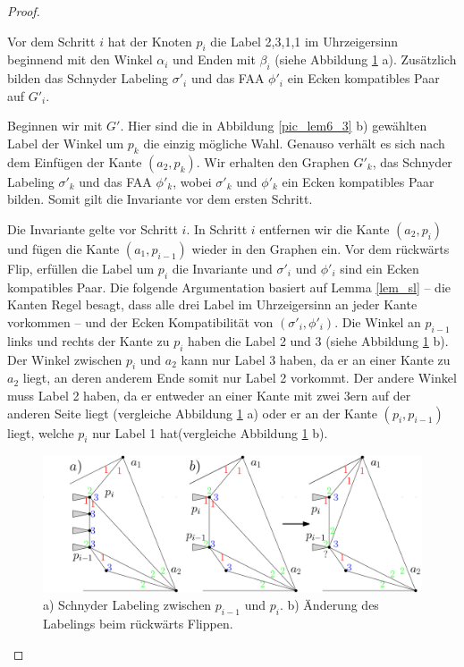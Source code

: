 \begin{proof}
\begin{invariant}
Vor dem Schritt $i$ hat der Knoten $p_i$ die Label 2,3,1,1 im Uhrzeigersinn beginnend mit den Winkel $\alpha_i$ und Enden mit $\beta_i$ (siehe Abbildung \ref{pic_lem6_4} a). Zusätzlich bilden das Schnyder Labeling $\sigma'_i$ und das FAA $\phi'_i$ ein Ecken kompatibles Paar auf $G'_i$.
\end{invariant}

Beginnen wir mit $G'$. Hier sind die in Abbildung \ref{pic_lem6_3} b) gewählten Label der Winkel um $p_k$ die einzig mögliche Wahl. Genauso verhält es sich nach dem Einfügen der Kante $(a_2,p_k)$. Wir erhalten den Graphen $G'_{k}$, das Schnyder Labeling $\sigma'_{k}$ und das FAA $\phi'_{k}$, wobei $\sigma'_{k}$ und $\phi'_{k}$ ein Ecken kompatibles Paar bilden. Somit gilt die Invariante vor dem ersten Schritt.

Die Invariante gelte vor Schritt $i$. In Schritt $i$ entfernen wir die Kante $(a_2,p_i)$ und fügen die Kante $(a_1,p_{i-1})$ wieder in den Graphen ein. Vor dem rückwärts Flip, erfüllen die Label um $p_i$ die Invariante und $\sigma'_{i}$ und $\phi'_{i}$ sind ein Ecken kompatibles Paar. Die folgende Argumentation basiert auf Lemma \ref{lem_sl} -- die Kanten Regel besagt, dass alle drei Label im Uhrzeigersinn an jeder Kante vorkommen -- und der Ecken Kompatibilität von $(\sigma'_{i},\phi'_{i})$. Die Winkel an $p_{i-1}$ links und rechts der Kante zu $p_i$ haben die Label 2 und 3 (siehe Abbildung \ref{pic_lem6_4} b). Der Winkel zwischen $p_i$ und $a_2$ kann nur Label 3 haben, da er an einer Kante zu $a_2$ liegt, an deren anderem Ende somit nur Label 2 vorkommt. Der andere Winkel muss Label 2 haben, da er entweder an einer Kante mit zwei 3ern auf der anderen Seite liegt (vergleiche Abbildung \ref{pic_lem6_4} a) oder er an der Kante $(p_i,p_{i-1})$ liegt, welche $p_i$ nur Label 1 hat(vergleiche Abbildung \ref{pic_lem6_4} b). 

\begin{figure}
	\centering
	  \includegraphics[width=1\textwidth]{lem6_4.png}
    	\caption{a) Schnyder Labeling zwischen $p_{i-1}$ und $p_{i}$. b) Änderung des Labelings beim rückwärts Flippen.}
    	\label{pic_lem6_4}
\end{figure}


\end{proof}
